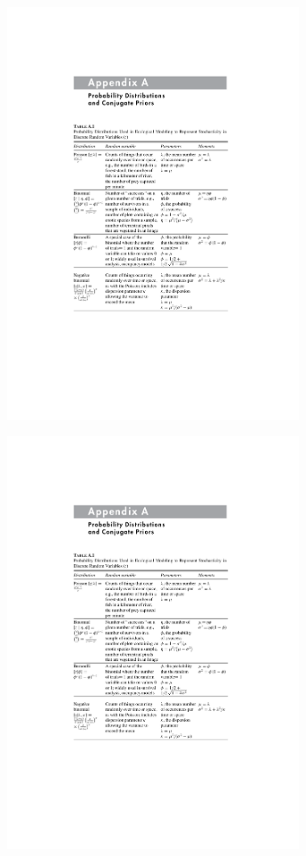 \documentclass{beamer}
\begin{document}
\begin{frame}
\begin{center}
  \includegraphics[page=2,width=0.65\textwidth]{distributions.pdf}
  \end{center}
\end{frame}

\begin{frame}
\begin{center}
  \includegraphics[page=3,width=0.65\textwidth]{distributions.pdf}
  \end{center}
\end{frame}
\end{document}
